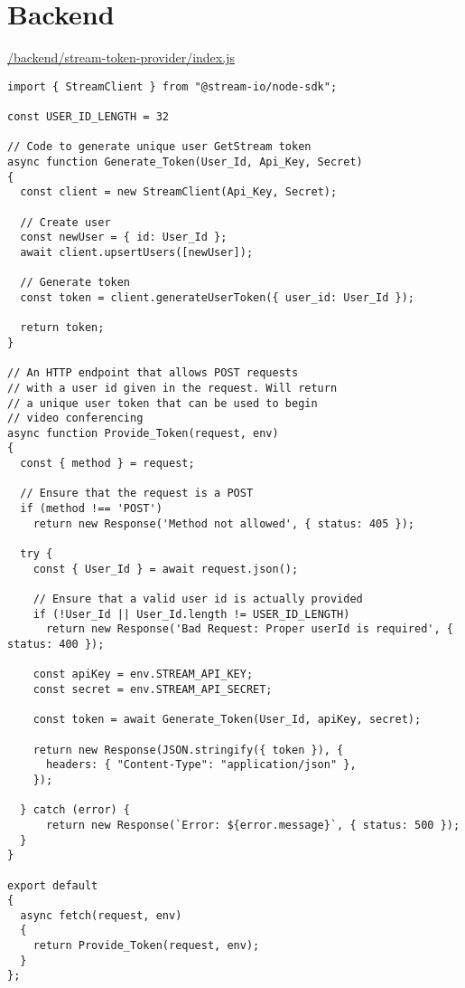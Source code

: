 \section{Backend}

\underline{/backend/stream-token-provider/index.js}

\begin{verbatim}
import { StreamClient } from "@stream-io/node-sdk";

const USER_ID_LENGTH = 32

// Code to generate unique user GetStream token
async function Generate_Token(User_Id, Api_Key, Secret)
{
  const client = new StreamClient(Api_Key, Secret);

  // Create user
  const newUser = { id: User_Id };
  await client.upsertUsers([newUser]);

  // Generate token
  const token = client.generateUserToken({ user_id: User_Id });

  return token;
}

// An HTTP endpoint that allows POST requests
// with a user id given in the request. Will return
// a unique user token that can be used to begin
// video conferencing
async function Provide_Token(request, env)
{
  const { method } = request;

  // Ensure that the request is a POST
  if (method !== 'POST')
    return new Response('Method not allowed', { status: 405 });

  try {
    const { User_Id } = await request.json();

    // Ensure that a valid user id is actually provided
    if (!User_Id || User_Id.length != USER_ID_LENGTH)
      return new Response('Bad Request: Proper userId is required', { status: 400 });

    const apiKey = env.STREAM_API_KEY;
    const secret = env.STREAM_API_SECRET;

    const token = await Generate_Token(User_Id, apiKey, secret);

    return new Response(JSON.stringify({ token }), {
      headers: { "Content-Type": "application/json" },
    });

  } catch (error) {
      return new Response(`Error: ${error.message}`, { status: 500 });
  }
}

export default
{
  async fetch(request, env)
  {
    return Provide_Token(request, env);
  }
};
\end{verbatim}
